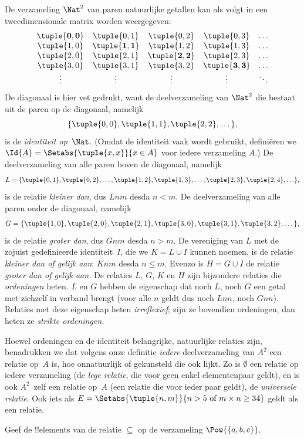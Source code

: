 \documentclass[../../../include/open-logic-section]{subfiles}
\begin{document}
\begin{ex}
De verzameling $\Nat^{2}$ van paren natuurlijke getallen kan als volgt
in een tweedimensionale matrix worden weergegeven:
\[
  \begin{array}{ccccc}
  \mathbf{\tuple{ 0,0 }} & \tuple{ 0,1 } &
    \tuple{ 0,2 } & \tuple{ 0,3 } & \ldots\\
  \tuple{ 1,0 } & \mathbf{\tuple{ 1,1 }} &
    \tuple{ 1,2 } & \tuple{ 1,3 } & \ldots\\
  \tuple{ 2,0 } & \tuple{ 2,1 } &
    \mathbf{\tuple{ 2,2 }} & \tuple{ 2,3 } & \ldots\\
  \tuple{ 3,0 } & \tuple{ 3,1 } & \tuple{ 3,2 } &
    \mathbf{\tuple{ 3,3 }} & \ldots\\
  \vdots & \vdots & \vdots & \vdots & \mathbf{\ddots}
  \end{array}
\]
De diagonaal is hier vet gedrukt, want de deelverzameling van $\Nat^2$
die bestaat uit de paren op de diagonaal, namelijk
\[
  \{\tuple{0,0 }, \tuple{ 1,1 }, \tuple{ 2,2 }, \dots\},
  \]
is de \emph{identiteit op}~$\Nat$. (Omdat de identiteit vaak wordt
gebruikt, definiëren we $\Id{A}=\Setabs{\tuple{ x,x }}{x \in A}$ voor
iedere verzameling $A$.) De deelverzameling van alle paren boven de
diagonaal, namelijk
\[
  L = \{\tuple{ 0,1 },\tuple{ 0,2 },\ldots,\tuple{ 1,2 },
  \tuple{ 1,3 }, \dots, \tuple{ 2,3 }, \tuple{ 2,4 },\ldots\},
\]
is de relatie \emph{kleiner dan}, dus $Lnm$ desda $n<m$. De
deelverzameling van alle paren onder de diagonaal, namelijk
\[
  G=\{ \tuple{ 1,0 },\tuple{ 2,0 },\tuple{
    2,1 }, \tuple{ 3,0 },\tuple{ 3,1 },\tuple{ 3,2 }, \dots\},
\]
is de relatie \emph{groter dan}, dus $Gnm$ desda $n>m$. De vereniging
van $L$ met de zojuist gedefinieerde identiteit~$I$, die we $K=L\cup I$
kunnen noemen, is de relatie
\emph{kleiner dan of gelijk aan}: $Knm$ desda $n \le m$. Evenzo is
$H=G \cup I$ de relatie \emph{groter dan of gelijk aan.} De relaties
$L$, $G$, $K$ en $H$ zijn bijzondere relaties die \emph{ordeningen}
heten. $L$ en $G$ hebben de eigenschap dat noch $L$, noch $G$ een getal
met zichzelf in verband brengt (voor alle $n$ geldt dus noch $Lnn$,
noch $Gnn$). Relaties met deze eigenschap heten \emph{irreflexief};
zijn ze bovendien ordeningen, dan heten ze \emph{strikte ordeningen.}
\end{ex}

\begin{explain}
Hoewel ordeningen en de identiteit belangrijke, natuurlijke relaties
zijn, benadrukken we dat volgens onze definitie \emph{iedere}
deelverzameling van $A^{2}$ een relatie op~$A$ is, hoe onnatuurlijk of
gekunsteld die ook lijkt. Zo is $\emptyset$ een relatie op iedere
verzameling (de \emph{lege relatie}, die voor geen enkel elementenpaar
geldt), en is ook $A^{2}$~zelf een relatie op~$A$ (een relatie die voor
ieder paar geldt), de \emph{universele relatie}. Ook iets als
$E=\Setabs{\tuple{n, m}}{n>5 \text{ of } m \times n \ge 34}$ geldt als
een relatie.
\end{explain}
  
\begin{prob}
  Geef de !!{element}s van de relatie $\subseteq$ op de verzameling
  $\Pow{\{a, b, c\}}$.
\end{prob}
\end{document}
